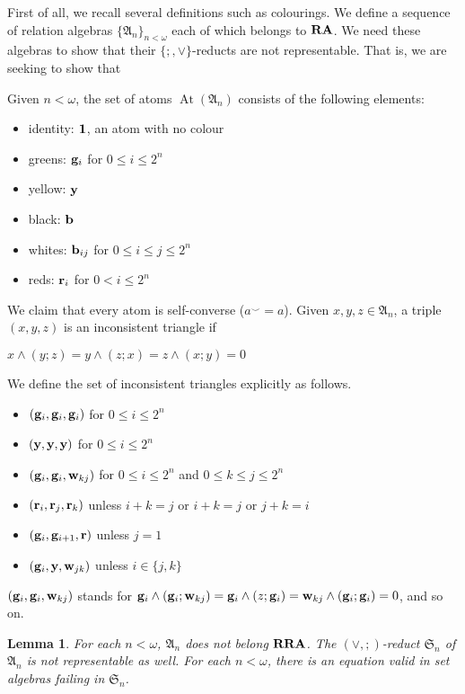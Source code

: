 \documentclass[a4paper]{article}
\theoremstyle{defin}
\theoremstyle{theorem}
\theoremstyle{prop}
\theoremstyle{lemma}
\newtheorem{lemma}{Lemma}
\theoremstyle{ex}
\theoremstyle{col}
\begin{document}
First of all, we recall several definitions such as colourings. We define a sequence of relation algebras $\{ \mathfrak{A}_n \}_{n < \omega}$ each of which belongs to ${\bf RA}$. We need these algebras to show that their $\{;, \vee\}$-reducts are not representable. That is, we are seeking to show that

Given $n < \omega$, the set of atoms $\operatorname{At}(\mathfrak{A}_n)$ consists of the following elements:
\begin{itemize}
\item identity: ${\bf 1}$, an atom with no colour
\item greens: ${\bf g}_i$ for $0 \leq i \leq 2^n$
\item yellow: ${\bf y}$
\item black: ${\bf b}$
\item whites: ${\bf b}_{ij}$ for $0 \leq i \leq j \leq 2^n$
\item reds: ${\bf r}_i$ for $0 <i \leq 2^n$
\end{itemize}
We claim that every atom is self-converse ($a^{\smile} = a$). Given $x, y, z \in \mathfrak{A}_n$, a triple $(x,y,z)$ is an  inconsistent triangle if
\begin{center}
$x \land (y ; z) = y \land (z ; x) = z \land (x ; y) = 0$
\end{center}
We define the set of inconsistent triangles explicitly as follows.
\begin{itemize}
  \item $({\bf g}_i, {\bf g}_i, {\bf g}_i)$ for $0 \leq i \leq 2^n$
  \item $({\bf y}, {\bf y}, {\bf y})$ for $0 \leq i \leq 2^n$
  \item $({\bf g}_i, {\bf g}_i, {\bf w}_{kj})$ for $0 \leq i \leq 2^n$ and $0 \leq k \leq j \leq 2^n$
  \item $({\bf r}_i, {\bf r}_j, {\bf r}_k)$ unless $i + k = j$ or $i + k = j$ or $j + k = i$
  \item $({\bf g}_i, {\bf g}_{i + 1}, {\bf r})$ unless $j = 1$
  \item $({\bf g}_i, {\bf y}, {\bf w}_{jk})$ unless $i \in \{ j, k \}$
\end{itemize}
$({\bf g}_i, {\bf g}_i, {\bf w}_{kj})$ stands for ${\bf g}_i \land ({\bf g}_i ; {\bf w}_{kj}) = {\bf g}_i \land (z ; {\bf g}_i) = {\bf w}_{kj} \land ({\bf g}_i ; {\bf g}_i) = 0$, and so on.

\begin{lemma}
  For each $n < \omega$, $\mathfrak{A}_n$ does not belong ${\bf RRA}$. The $(\vee, ;)$-reduct $\mathfrak{S}_n$ of $\mathfrak{A}_n$ is not representable as well. For each $n < \omega$, there is an equation valid in set algebras failing in $\mathfrak{S}_n$.
\end{lemma}
\end{document}
